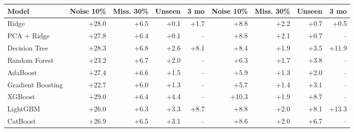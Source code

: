 \begin{tabular}{lrrrrrrrr}
\toprule
Model & Noise 10\% & Miss. 30\% & Unseen & 3 mo & Noise 10\% & Miss. 30\% & Unseen & 3 mo \\
\midrule
Ridge & +28.0 & +6.5 & +0.1 & +1.7 & +8.8 & +2.2 & +0.7 & +0.5 \\
PCA + Ridge & +27.8 & +6.4 & +0.1 & -- & +8.8 & +2.1 & +0.7 & -- \\
Decision Tree & +28.3 & +6.8 & +2.6 & +8.1 & +8.4 & +1.9 & +3.5 & +11.9 \\
Random Forest & +23.2 & +6.7 & +2.0 & -- & +6.3 & +1.7 & +3.8 & -- \\
AdaBoost & +27.4 & +6.6 & +1.5 & -- & +5.9 & +1.3 & +2.0 & -- \\
Gradient Boosting & +22.7 & +6.0 & +1.3 & -- & +5.7 & +1.4 & +3.1 & -- \\
XGBoost & +29.0 & +6.4 & +4.4 & -- & +10.3 & +1.9 & +8.7 & -- \\
LightGBM & +26.0 & +6.3 & +3.3 & +8.7 & +8.8 & +2.0 & +8.1 & +13.3 \\
CatBoost & +26.9 & +6.5 & +3.1 & -- & +8.6 & +2.0 & +6.7 & -- \\
\bottomrule
\end{tabular}
